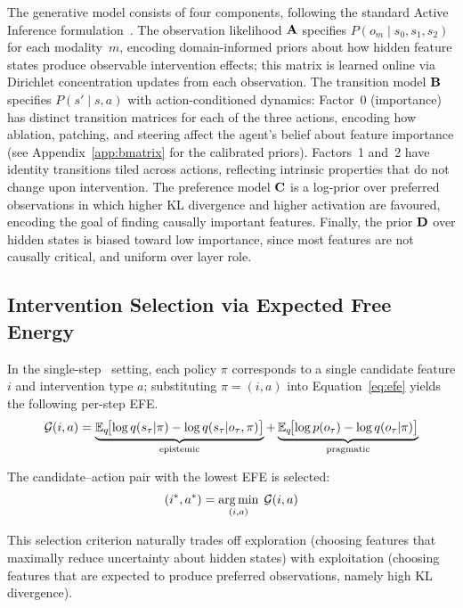 The generative model consists of four components, following the
standard Active Inference formulation~\cite{Friston2017,Parr2022}.
The observation likelihood $\mathbf{A}$ specifies
$P(o_m \mid s_0, s_1, s_2)$ for each modality~$m$, encoding
domain-informed priors about how hidden feature states produce
observable intervention effects; this matrix is learned online via
Dirichlet concentration updates from each observation.  The
transition model $\mathbf{B}$ specifies $P(s' \mid s, a)$ with
action-conditioned dynamics: Factor~0 (importance) has distinct
transition matrices for each of the three actions, encoding how
ablation, patching, and steering affect the agent's belief about
feature importance (see Appendix~\ref{app:bmatrix} for the
calibrated priors).  Factors~1 and~2 have identity transitions
tiled across actions, reflecting intrinsic properties that do not
change upon intervention.  The preference model $\mathbf{C}$
is a log-prior over preferred observations in which higher KL
divergence and higher activation are favoured, encoding the goal of
finding causally important features.  Finally, the prior $\mathbf{D}$
over hidden states is biased toward low importance, since most
features are not causally critical, and uniform over layer role.


\subsection{Intervention Selection via Expected Free Energy}

In the single-step \ACD\ setting, each policy $\pi$ corresponds to a
single candidate feature $i$ and intervention type $a$; substituting
$\pi = (i, a)$ into Equation~\ref{eq:efe} yields the following per-step EFE.
\begin{equation}
  \label{eq:efe_agent}
  \mathcal{G}(i, a) = \underbrace{\mathbb{E}_{q}\!\bigl[\log q(s_\tau | \pi) - \log q(s_\tau | o_\tau, \pi)\bigr]}_{\text{epistemic}} + \underbrace{\mathbb{E}_{q}\!\bigl[\log p(o_\tau) - \log q(o_\tau | \pi)\bigr]}_{\text{pragmatic}}
\end{equation}

The candidate--action pair with the lowest EFE is selected:
\begin{equation}
  \label{eq:efe_select}
  (i^*, a^*) = \operatorname*{arg\,min}_{(i,a)}\; \mathcal{G}(i, a)
\end{equation}

This selection criterion naturally trades off exploration (choosing
features that maximally reduce uncertainty about hidden states) with
exploitation (choosing features that are expected to produce preferred
observations, namely high KL divergence).


